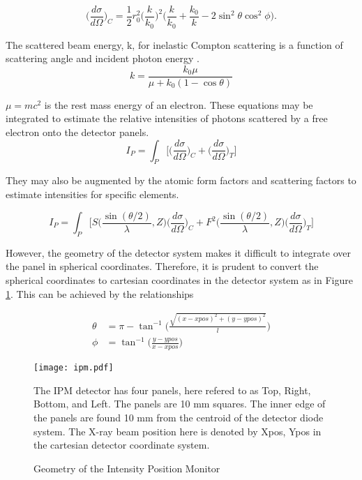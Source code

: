 \documentclass{report}
\begin{document}
\begin{equation}
\label{compton}
\bigg( \frac {d\sigma}{d\Omega} \bigg)_C = \frac {1} {2} r_0^2 \bigg(\frac{k}{k_0}\bigg)^2\bigg(\frac {k} {k_0} + \frac {k_0} {k} - 2 \sin^2 \theta \cos^2 \phi \bigg).
\end{equation}

The scattered beam energy, k, for inelastic Compton scattering is a function of scattering angle and incident photon energy \cite{Heitler1954-vq}.
\begin{equation}
k = \frac {k_0 \mu} {\mu + k_0 (1 - \cos \theta)}
\end{equation}

$\mu = mc^2$ is the rest mass energy of an electron. 
These equations may be integrated to estimate the relative intensities of photons scattered by a free electron onto the detector panels. 
\begin{equation}
I_P = \int_{P} \bigg[  \bigg( \frac {d\sigma}{d\Omega} \bigg)_C 
+ \bigg( \frac {d\sigma}{d\Omega} \bigg)_T \bigg]
\end{equation}

They may also be augmented by the atomic form factors and scattering factors to estimate intensities for specific elements. 

\begin{equation}
I_P = \int_{P} \bigg[  S \bigg( \frac {\sin ( \theta/2 )}{\lambda}, Z \bigg) \bigg( \frac {d\sigma}{d\Omega} \bigg)_C 
+ F^2 \bigg( \frac {\sin ( \theta/2 )}{\lambda}, Z \bigg) \bigg( \frac {d\sigma}{d\Omega} \bigg)_T \bigg]
\end{equation}

However, the geometry of the detector system makes it difficult to integrate over the panel in spherical coordinates. Therefore, it is prudent to convert the spherical coordinates to cartesian coordinates in the detector system as in Figure \ref{ipm}. This can be achieved by the relationships

\begin{equation}
\begin{align*}
\theta &= \pi - \tan^{-1} {\bigg( \frac {\sqrt{(x-xpos)^2 + (y-ypos)^2}} {l} \bigg)} \\
\phi   &= \tan^{-1} \bigg(\frac {y - ypos} {x - xpos} \bigg)
\end{align*}
\end{equation}



\begin{figure}
\centering
\texttt{[image: ipm.pdf]}
\caption{Geometry of the Intensity Position Monitor}
\label{ipm}
The IPM detector has four panels, here refered to as Top, Right, Bottom, and Left. The panels are 10 mm squares. The inner edge of the panels are found 10 mm from the centroid of the detector diode system. The X-ray beam position here is denoted by Xpos, Ypos in the cartesian detector coordinate system.  
\end{figure}
\end{document}
